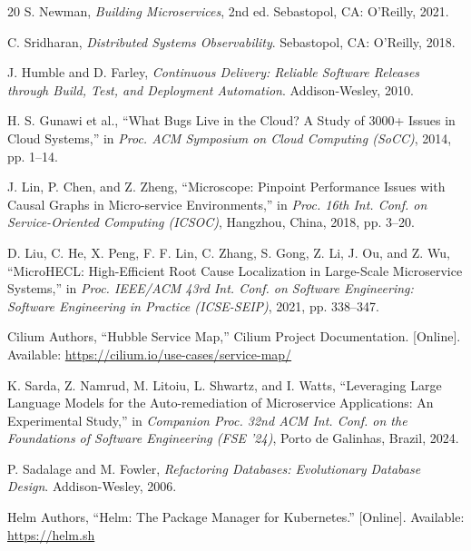 \documentclass[conference]{IEEEtran}
\begin{document}
\begin{thebibliography}{20}
 S. Newman, \emph{Building Microservices}, 2nd ed. Sebastopol, CA: O'Reilly, 2021.

 C. Sridharan, \emph{Distributed Systems Observability}. Sebastopol, CA: O'Reilly, 2018.

 J. Humble and D. Farley, \emph{Continuous Delivery: Reliable Software Releases through Build, Test, and Deployment Automation}. Addison-Wesley, 2010.

 H. S. Gunawi et al., ``What Bugs Live in the Cloud? A Study of 3000+ Issues in Cloud Systems,'' in \emph{Proc. ACM Symposium on Cloud Computing (SoCC)}, 2014, pp. 1--14.

 J. Lin, P. Chen, and Z. Zheng, ``Microscope: Pinpoint Performance Issues with Causal Graphs in Micro-service Environments,'' in \emph{Proc. 16th Int. Conf. on Service-Oriented Computing (ICSOC)}, Hangzhou, China, 2018, pp. 3--20.

 D. Liu, C. He, X. Peng, F. F. Lin, C. Zhang, S. Gong, Z. Li, J. Ou, and Z. Wu, ``MicroHECL: High-Efficient Root Cause Localization in Large-Scale Microservice Systems,'' in \emph{Proc. IEEE/ACM 43rd Int. Conf. on Software Engineering: Software Engineering in Practice (ICSE-SEIP)}, 2021, pp. 338--347.

 Cilium Authors, ``Hubble Service Map,'' Cilium Project Documentation. [Online]. Available: \url{https://cilium.io/use-cases/service-map/}

 K. Sarda, Z. Namrud, M. Litoiu, L. Shwartz, and I. Watts, ``Leveraging Large Language Models for the Auto-remediation of Microservice Applications: An Experimental Study,'' in \emph{Companion Proc. 32nd ACM Int. Conf. on the Foundations of Software Engineering (FSE '24)}, Porto de Galinhas, Brazil, 2024.

 P. Sadalage and M. Fowler, \emph{Refactoring Databases: Evolutionary Database Design}. Addison-Wesley, 2006.

 Helm Authors, ``Helm: The Package Manager for Kubernetes.'' [Online]. Available: \url{https://helm.sh}

\end{thebibliography}
\end{document}
